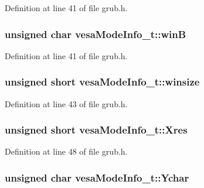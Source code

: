 Definition at line 41 of file grub.\+h.

\hypertarget{structvesaModeInfo__t_a386d2bc2570ec21a98664958429247ed}{
\subsubsection[{win\+B}]{\setlength{\rightskip}{0pt plus 5cm}unsigned char vesa\+Mode\+Info\+\_\+t\+::win\+B}}\label{structvesaModeInfo__t_a386d2bc2570ec21a98664958429247ed}


Definition at line 41 of file grub.\+h.

\hypertarget{structvesaModeInfo__t_a215d7dc86f8c13909156dbff6518d0c8}{
\subsubsection[{winsize}]{\setlength{\rightskip}{0pt plus 5cm}unsigned short vesa\+Mode\+Info\+\_\+t\+::winsize}}\label{structvesaModeInfo__t_a215d7dc86f8c13909156dbff6518d0c8}


Definition at line 43 of file grub.\+h.

\hypertarget{structvesaModeInfo__t_a5ed5fe4414e2a46fa3670733486905ae}{
\subsubsection[{Xres}]{\setlength{\rightskip}{0pt plus 5cm}unsigned short vesa\+Mode\+Info\+\_\+t\+::\+Xres}}\label{structvesaModeInfo__t_a5ed5fe4414e2a46fa3670733486905ae}


Definition at line 48 of file grub.\+h.

\hypertarget{structvesaModeInfo__t_a1c395c3097057ffd0f3d12ea9df6133d}{
\subsubsection[{Ychar}]{\setlength{\rightskip}{0pt plus 5cm}unsigned char vesa\+Mode\+Info\+\_\+t\+::\+Ychar}}\label{structvesaModeInfo__t_a1c395c3097057ffd0f3d12ea9df6133d}


